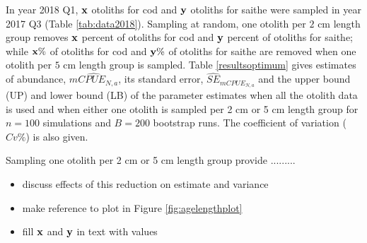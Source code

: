 \documentclass[a4paper 12pt]{article}
\numberwithin{equation}{section}
\begin{document}
In year 2018 Q1, ${\bf x}$ otoliths for cod and ${\bf y}$ otoliths for saithe were sampled in year 2017 Q3 (Table \ref{tab:data2018}). Sampling at random, one otolith per $2$ cm length group removes ${\bf x}$ percent of otoliths for cod and ${\bf y}$ percent of otoliths for saithe; while ${\bf x \%}$ of otoliths  for cod and ${\bf y \%}$  of otoliths for saithe are removed when one otolith per $5$ cm length group is sampled. Table \ref{resultsoptimum} gives estimates of abundance, $\widehat{mCPUE_{N,a}}$, its standard error, $\widehat{SE}_{mCPUE_{N,a}}$ and the upper bound (UP) and lower bound (LB) of the parameter estimates when all the otolith data is used and when either one otolith is sampled per 2 cm or 5 cm length group for  $n = 100$ simulations and $B = 200$ bootstrap runs. The coefficient of variation ($Cv \%$) is also given.

Sampling one otolith per 2 cm or 5 cm length group provide .........

\begin{itemize}
\item discuss effects of this reduction on estimate and variance
\item make reference to plot in Figure \ref{fig:agelengthplot}
\item fill ${\bf x}$  and ${\bf y}$ in text with values 
\end{itemize}
\end{document}
